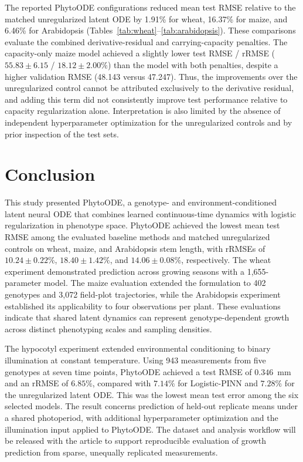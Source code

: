 \documentclass[preprint,12pt,authoryear]{elsarticle}
\newcommand{\model}{PhytoODE}
\begin{document}
The reported PhytoODE configurations reduced mean test RMSE relative to the matched unregularized latent ODE by 1.91\% for wheat, 16.37\% for maize, and 6.46\% for Arabidopsis (Tables~\ref{tab:wheat}--\ref{tab:arabidopsis}). These comparisons evaluate the combined derivative-residual and carrying-capacity penalties. The capacity-only maize model achieved a slightly lower test RMSE / rRMSE ($55.83\pm6.15$ / $18.12\pm2.00\%$) than the model with both penalties, despite a higher validation RMSE (48.143 versus 47.247). Thus, the improvements over the unregularized control cannot be attributed exclusively to the derivative residual, and adding this term did not consistently improve test performance relative to capacity regularization alone. Interpretation is also limited by the absence of independent hyperparameter optimization for the unregularized controls and by prior inspection of the test sets.

\section{Conclusion}
\label{sec:conclusion}

This study presented \model{}, a genotype- and environment-conditioned latent neural ODE that combines learned continuous-time dynamics with logistic regularization in phenotype space. PhytoODE achieved the lowest mean test RMSE among the evaluated baseline methods and matched unregularized controls on wheat, maize, and Arabidopsis stem length, with rRMSEs of $10.24\pm0.22\%$, $18.40\pm1.42\%$, and $14.06\pm0.08\%$, respectively. The wheat experiment demonstrated prediction across growing seasons with a 1,655-parameter model. The maize evaluation extended the formulation to 402 genotypes and 3,072 field-plot trajectories, while the Arabidopsis experiment established its applicability to four observations per plant. These evaluations indicate that shared latent dynamics can represent genotype-dependent growth across distinct phenotyping scales and sampling densities.

The hypocotyl experiment extended environmental conditioning to binary illumination at constant temperature. Using 943 measurements from five genotypes at seven time points, PhytoODE achieved a test RMSE of $0.346$~mm and an rRMSE of $6.85\%$, compared with $7.14\%$ for Logistic-PINN and $7.28\%$ for the unregularized latent ODE. This was the lowest mean test error among the six selected models. The result concerns prediction of held-out replicate means under a shared photoperiod, with additional hyperparameter optimization and the illumination input applied to PhytoODE. The dataset and analysis workflow will be released with the article to support reproducible evaluation of growth prediction from sparse, unequally replicated measurements.
\end{document}
